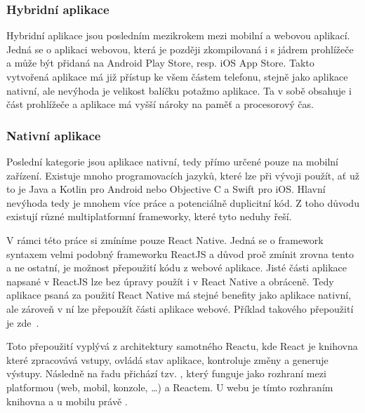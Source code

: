 \subsubsection*{Hybridní aplikace}
Hybridní aplikace jsou posledním mezikrokem mezi mobilní a webovou aplikací. Jedná se o aplikaci webovou, která je později zkompilovaná i s jádrem prohlížeče a může být přidaná na Android Play Store, resp. iOS App Store. Takto vytvořená aplikace má již přístup ke všem částem telefonu, stejně jako aplikace nativní, ale nevýhoda je velikost balíčku potažmo aplikace. Ta v sobě obsahuje i část prohlížeče a aplikace má vyšší nároky na paměť a procesorový čas.

\subsubsection*{Nativní aplikace}
Poslední kategorie jsou aplikace nativní, tedy přímo určené pouze na mobilní zařízení. Existuje mnoho programovacích jazyků, které lze při vývoji použít, ať už to je Java a Kotlin pro Android nebo Objective C a Swift pro iOS. Hlavní nevýhoda tedy je mnohem více práce a potenciálně duplicitní kód. Z toho důvodu existují různé multiplatformní frameworky, které tyto neduhy řeší.

V rámci této práce si zmíníme pouze React Native. Jedná se o framework syntaxem velmi podobný frameworku ReactJS a důvod proč zmínit zrovna tento a ne ostatní, je možnost přepoužití kódu z webové aplikace. Jisté části aplikace napsané v ReactJS lze bez úpravy použít i v React Native a obráceně. Tedy aplikace psaná za použití React Native má stejné benefity jako aplikace nativní, ale zároveň v ní lze přepoužít části aplikace webové. Příklad takového přepoužití je zde~\cite{sepulveda_2017_share}.

Toto přepoužití vyplývá z architektury samotného Reactu, kde React je knihovna které zpracovává vstupy, ovládá stav aplikace, kontroluje změny a generuje výstupy. Následně na řadu přichází tzv. , který funguje jako rozhraní mezi platformou (web, mobil, konzole, \ldots{}) a Reactem. U webu je tímto rozhraním knihovna  a u mobilu právě .

